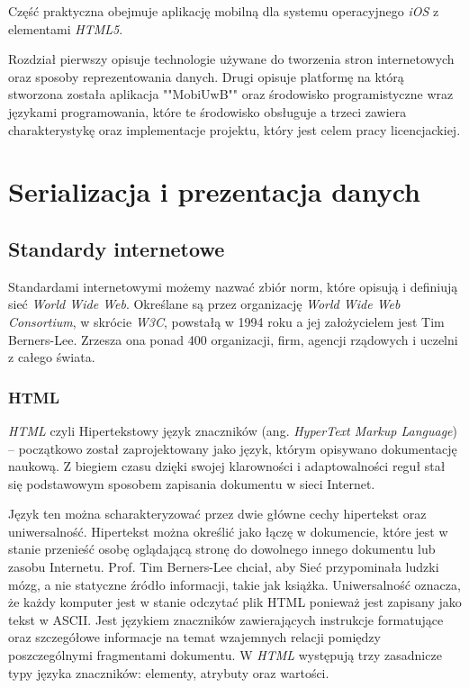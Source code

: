 \documentclass{iiuwb}
\begin{document}
Część praktyczna obejmuje aplikację mobilną dla systemu operacyjnego \textit{iOS} z elementami \textit{HTML5}.

Rozdział pierwszy opisuje technologie używane do tworzenia stron internetowych oraz sposoby reprezentowania danych. Drugi opisuje platformę na którą stworzona została aplikacja ""MobiUwB"" oraz środowisko programistyczne wraz językami programowania, które te środowisko obsługuje a trzeci zawiera charakterystykę oraz implementacje projektu, który jest celem pracy licencjackiej.                                                                
\cleardoublepage
\chapter{Serializacja i prezentacja danych}
\label{cha:Serializacja i prezentacja danych}

\section{Standardy internetowe}

Standardami internetowymi możemy nazwać zbiór norm, które opisują i definiują sieć \textit{World Wide Web}. Określane są przez organizację \textit{World Wide Web Consortium}, w skrócie \textit{W3C}, powstałą w 1994 roku a jej założycielem jest Tim Berners-Lee. Zrzesza ona ponad 400 organizacji, firm, agencji rządowych i uczelni z całego świata. 

\subsection{HTML}

\textit{HTML} \cite{Berjon:14:H} czyli Hipertekstowy język znaczników (ang. \textit{HyperText Markup Language}) -- początkowo został zaprojektowany jako język, którym opisywano dokumentację naukową. Z biegiem czasu dzięki swojej klarowności i adaptowalności reguł  stał się podstawowym sposobem zapisania dokumentu w sieci Internet. 

Język ten można scharakteryzować przez dwie główne cechy hipertekst oraz uniwersalność. Hipertekst można określić jako łączę w dokumencie, które jest w stanie przenieść osobę oglądającą stronę do dowolnego innego dokumentu lub zasobu Internetu. Prof. Tim Berners-Lee chciał, aby Sieć przypominała ludzki mózg, a nie statyczne źródło informacji, takie jak książka. Uniwersalność oznacza, że każdy komputer jest w stanie odczytać plik HTML ponieważ jest zapisany jako tekst w ASCII. Jest językiem znaczników zawierających instrukcje formatujące oraz szczegółowe informacje na temat wzajemnych relacji pomiędzy poszczególnymi fragmentami dokumentu. W \textit{HTML} występują trzy zasadnicze typy języka znaczników: elementy, atrybuty oraz wartości.
\end{document}
